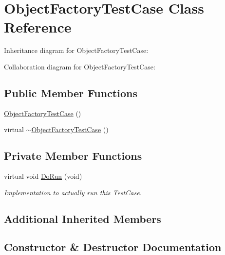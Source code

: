 \hypertarget{classObjectFactoryTestCase}{}\section{Object\+Factory\+Test\+Case Class Reference}
\label{classObjectFactoryTestCase}


Inheritance diagram for Object\+Factory\+Test\+Case\+:


Collaboration diagram for Object\+Factory\+Test\+Case\+:
\subsection*{Public Member Functions}
\begin{DoxyCompactItemize}
\item 
\hyperlink{classObjectFactoryTestCase_ab34643fb562a87f5d61a5b003325ef6f}{Object\+Factory\+Test\+Case} ()
\item 
virtual \hyperlink{classObjectFactoryTestCase_a36b7c8f6cfc5c39b7fc3d803d23c5b3e}{$\sim$\+Object\+Factory\+Test\+Case} ()
\end{DoxyCompactItemize}
\subsection*{Private Member Functions}
\begin{DoxyCompactItemize}
\item 
virtual void \hyperlink{classObjectFactoryTestCase_ab6f760c13e727b5ca3205d5f28ea04f4}{Do\+Run} (void)
\begin{DoxyCompactList}\small\item\em Implementation to actually run this Test\+Case. \end{DoxyCompactList}\end{DoxyCompactItemize}
\subsection*{Additional Inherited Members}


\subsection{Constructor \& Destructor Documentation}
